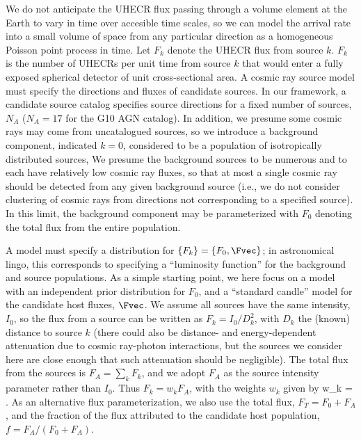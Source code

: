 We do not anticipate the UHECR flux passing through a volume element at the
Earth to vary in time over accesible time scales, so we can model the
arrival rate into a small volume of space from any particular direction as a
homogeneous Poisson point process in time.  Let $F_k$ denote the UHECR flux
from source $k$.  $F_k$ is the number of UHECRs per unit time from source
$k$ that would enter a fully exposed spherical detector of unit
cross-sectional area.  A cosmic ray source model must specify the directions
and fluxes of candidate sources.  In our framework, a candidate source
catalog specifies source directions for a fixed number of sources, $N_A$
($N_A = 17$ for the G10 AGN catalog).  In addition, we presume some cosmic
rays may come from uncatalogued sources, so we introduce a background
component, indicated $k=0$, considered to be a population of isotropically
distributed sources,   We presume the background sources to be numerous
and to each have relatively low cosmic ray fluxes, so that at most a
single cosmic ray should be detected from any given background source
(i.e., we do not consider clustering of cosmic rays from directions not
corresponding to a specified source).  In this limit, the background
component may be parameterized with $F_0$ denoting the total flux from the
entire population.


A model must specify a distribution for $\{F_k\} = \{F_0, \Fvec\}$; in
astronomical lingo, this corresponds to specifying a ``luminosity function''
for the background and source populations.  As a simple starting point, we
here focus on a model with an independent prior distribution for $F_0$, and
a ``standard candle'' model for the candidate host fluxes, $\Fvec$.  We
assume all sources have the same intensity, $I_0$, so the flux from a source
can be written as $F_k = I_0/D_k^2$, with $D_k$ the (known) distance to
source $k$ (there could also be distance- and energy-dependent attenuation
due to cosmic ray-photon interactions, but the sources we consider here are
close enough that such attenuation should be negligible).  The total flux
from the sources is $F_A = \sum_k F_k$, and we adopt $F_A$ as the source
intensity parameter rather than $I_0$.  Thus $F_k = w_k F_A$, with the
weights $w_k$ given by
\be
w_k = .
\label{wt-def}
\ee
As an alternative flux parameterization, we also use the total flux,
$F_T = F_0 + F_A$, and the fraction of the flux attributed to the candidate
host population, $f = F_A/(F_0 + F_A)$.


